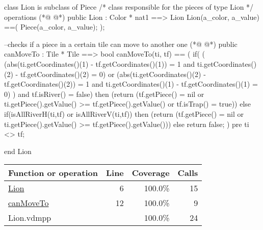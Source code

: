 \begin{vdmpp}[breaklines=true]
class Lion is subclass of Piece
/*
class responsible for the pieces of type Lion
*/
operations
(*@
\label{Lion:6}
@*)
 public Lion : Color * nat1 ==> Lion
   Lion(a_color, a_value) ==(
    Piece(a_color, a_value);
   );
   
 --checks if a piece in a certain tile can move to another one
(*@
\label{canMoveTo:12}
@*)
 public canMoveTo : Tile * Tile  ==> bool
 canMoveTo(ti, tf) 
  ==  (
    if(
       (
       (abs(ti.getCoordinates()(1) - tf.getCoordinates()(1)) = 1 and ti.getCoordinates()(2) - tf.getCoordinates()(2) = 0) or 
       (abs(ti.getCoordinates()(2) - tf.getCoordinates()(2)) = 1 and ti.getCoordinates()(1) - tf.getCoordinates()(1) = 0)
       ) 
      and tf.isRiver() = false)
       then (return (tf.getPiece() = nil or ti.getPiece().getValue() >= tf.getPiece().getValue() or tf.isTrap() = true)) 
    else if(isAllRiverH(ti,tf) or isAllRiverV(ti,tf))
       then (return (tf.getPiece() = nil or ti.getPiece().getValue() >= tf.getPiece().getValue()))
    else
      return false;
    )
 pre ti <> tf;
   

end Lion
\end{vdmpp}
\bigskip
\begin{longtable}{|l|r|r|r|}
\hline
Function or operation & Line & Coverage & Calls \\
\hline
\hline
\hyperref[Lion:6]{Lion} & 6&100.0\% & 15 \\
\hline
\hyperref[canMoveTo:12]{canMoveTo} & 12&100.0\% & 9 \\
\hline
\hline
Lion.vdmpp & & 100.0\% & 24 \\
\hline
\end{longtable}

